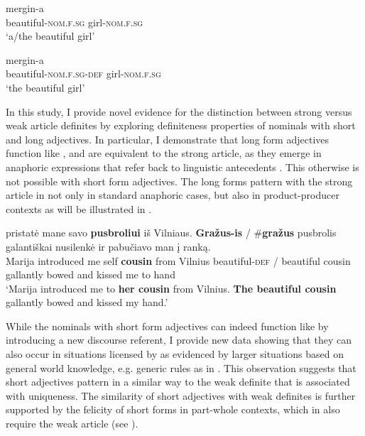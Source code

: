 \documentclass[output=paper,
modfonts
]{langscibook}
\begin{document}
\begin{exe}
\ex \label{ex:sereikaite:1} 
\begin{xlist}
\ex 
{} {mergin-a} \\
beautiful-\textsc{nom.f.sg}  girl-\textsc{nom.f.sg}\\
\trans `a/the beautiful girl'  \label{ex:sereikaite:1a} 

\ex 
{} {mergin-a}\\
beautiful-\textsc{nom.f.sg}-{\textsc{def}} girl-\textsc{nom.f.sg}\\
\trans `the beautiful girl' \label{ex:sereikaite:1b}
\end{xlist}
\end{exe}

In this study, I provide novel evidence for the distinction between strong versus weak article definites \citep{Schwarz2009} by exploring definiteness properties of  nominals with short and long adjectives. In particular, I demonstrate that long form adjectives function like , and are equivalent to the  strong article, as they emerge in anaphoric expressions that refer back to linguistic antecedents . This  otherwise is not possible with short form adjectives. The long forms pattern with the strong article in  not only in standard anaphoric cases, but also in product-producer  contexts as will be illustrated in . \newpage

\begin{exe}
\ex\label{ex:sereikaite:2} 
 {pristatė} {mane} {savo} \textbf{pusbroliui} {iš} {Vilniaus}. \textbf{Gražus-is} \textnormal{/} \textnormal{\#}\textbf{gražus} {pusbrolis} {galantiškai} {nusilenkė} {ir} {pabučiavo} {man} {į} {ranką}.\\
Marija introduced me self \textbf{cousin} from Vilnius {beautiful-\textsc{def}} / {\phantom{\#}beautiful} cousin gallantly bowed and kissed me to hand \\
\trans `Marija introduced me to \textbf{her cousin} from Vilnius. \textbf{The beautiful cousin} gallantly bowed and kissed my hand.'
\end{exe}


While the nominals with short form adjectives can indeed function like  by introducing a new discourse referent, I provide new data showing that they can also occur in situations licensed by  as evidenced by larger situations based on general world knowledge, e.g. generic rules as in . This observation suggests that short adjectives pattern in a similar way to the weak definite that is associated with uniqueness. 
The similarity of short adjectives with weak definites is further supported by the felicity of short forms in part-whole  contexts, which in  also require the weak article (see ). 
\end{document}
